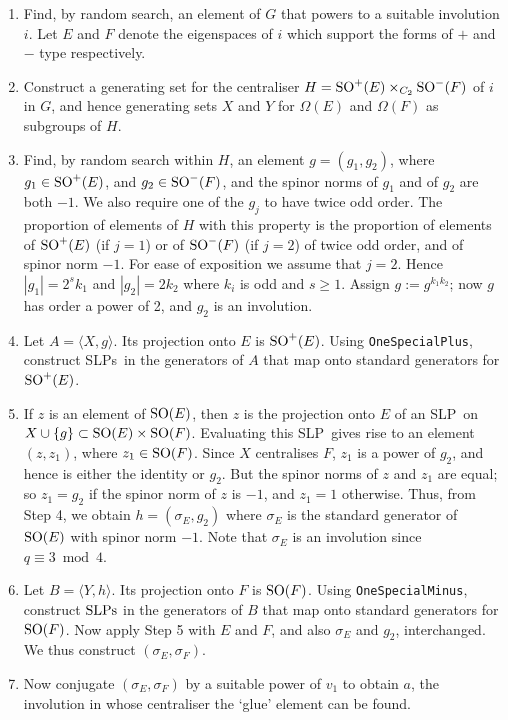 \documentclass[12pt]{article}
\def\SO{{\rm SO}}
\def\SLP{{\rm SLP}}
\def\SLPs{{\rm SLPs}}
\begin{document}
\begin{enumerate}
\item 
Find, by random search, an element of $G$ that powers to a 
suitable involution $i$. 
Let $E$ and $F$ denote the eigenspaces of $i$ which support
the forms of $+$ and $-$ type respectively.

\item 
Construct a generating set for the centraliser
$H=\SO^+(E)\times_{C_2}\SO^-(F)$ of $i$ in $G$, 
and hence generating sets $X$ and $Y$ for $\Omega(E)$ and $\Omega(F)$ as
subgroups of $H$.  

\item 
Find, by random search 
within $H$, an element $g=(g_1,g_2)$, where
$g_1\in\SO^+(E)$, and $g_2\in\SO^-(F)$, and the spinor norms of 
$g_1$ and of $g_2$ are both $-1$.  We also require one of the $g_j$
to have twice odd order.  
The proportion of elements of $H$ with this property
is the proportion of elements of 
$\SO^+(E)$ (if $j=1$) or of $\SO^-(F)$ (if $j=2$)
of twice odd order, and of spinor norm $-1$.  
For ease of exposition we assume that $j=2$.
Hence $|g_1| = 2^s k_1$ and $|g_2| = 2 k_2$ where $k_i$ is odd and $s \geq 1$. 
Assign $g := g^{k_1 k_2}$; now $g$ has order a 
power of 2, and $g_2$ is an involution.  

\item Let $A = \langle X, g \rangle$.
Its projection onto $E$ is $\SO^+(E)$.
Using {\tt OneSpecialPlus},
construct \SLPs\ in the generators of $A$ that map onto 
standard generators for $\SO^+(E)$.

\item 
If $z$ is an element of $\SO(E)$, then $z$ is the projection onto $E$ of
an \SLP\ on $X\cup\{g\}\subset\SO(E)\times\SO(F)$.  Evaluating this
\SLP\ gives rise to an element $(z,z_1)$, where $z_1\in\SO(F)$.  
Since $X$ centralises $F$, $z_1$ is a power of $g_2$, and hence is 
either the identity
or $g_2$. But the spinor norms of $z$ and $z_1$ are equal; so $z_1=g_2$ if
the spinor norm of $z$ is $-1$, and $z_1=1$ otherwise.  Thus, from
Step 4, we obtain $h=(\sigma_E,g_2)$ where $\sigma_E$ is the standard
generator of $\SO(E)$ with spinor norm $-1$.  Note that $\sigma_E$ is an
involution since $q\equiv3\bmod4$.

\item Let $B=\langle Y,h\rangle$.  Its projection onto $F$ is $\SO(F)$.
Using {\tt OneSpecialMinus}, construct $\SLPs$ in the generators of $B$ 
that map onto standard generators for $\SO(F)$.  Now apply Step 5 
with $E$ and $F$,
and also $\sigma_E$ and $g_2$, interchanged.  We thus construct
$(\sigma_E,\sigma_F)$.

\item  Now conjugate
$(\sigma_E, \sigma_F)$ by a suitable
power of $v_1$ to obtain $a$, the involution
in whose centraliser the `glue' element can be found.

\end{enumerate}
\end{document}
